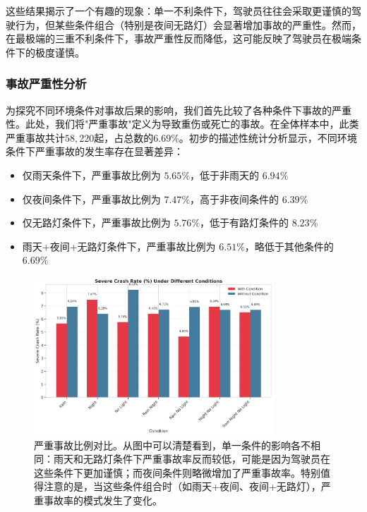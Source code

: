 \documentclass[12pt,a4paper]{article}
\begin{document}
这些结果揭示了一个有趣的现象：单一不利条件下，驾驶员往往会采取更谨慎的驾驶行为，但某些条件组合（特别是夜间无路灯）会显著增加事故的严重性。然而，在最极端的三重不利条件下，事故严重性反而降低，这可能反映了驾驶员在极端条件下的极度谨慎。

\subsubsection{事故严重性分析}

为探究不同环境条件对事故后果的影响，我们首先比较了各种条件下事故的严重性。此处，我们将"严重事故"定义为导致重伤或死亡的事故。在全体样本中，此类严重事故共计$58,220$起，占总数的$6.69\%$。初步的描述性统计分析显示，不同环境条件下严重事故的发生率存在显著差异：

\begin{itemize}
\item 仅雨天条件下，严重事故比例为 $5.65\%$，低于非雨天的 $6.94\%$
\item 仅夜间条件下，严重事故比例为 $7.47\%$，高于非夜间条件的 $6.39\%$
\item 仅无路灯条件下，严重事故比例为 $5.76\%$，低于有路灯条件的 $8.23\%$
\item 雨天+夜间+无路灯条件下，严重事故比例为 $6.51\%$，略低于其他条件的 $6.69\%$
\end{itemize}

\begin{figure}[H]
  \centering
  \includegraphics[width=0.8\textwidth]{severe_crash_rate_by_condition.png}
  \caption{严重事故比例对比。从图中可以清楚看到，单一条件的影响各不相同：雨天和无路灯条件下严重事故率反而较低，可能是因为驾驶员在这些条件下更加谨慎；而夜间条件则略微增加了严重事故率。特别值得注意的是，当这些条件组合时（如雨天+夜间、夜间+无路灯），严重事故率的模式发生了变化。}
  \label{fig:severe_rate_comparison}
\end{figure}
\end{document}
